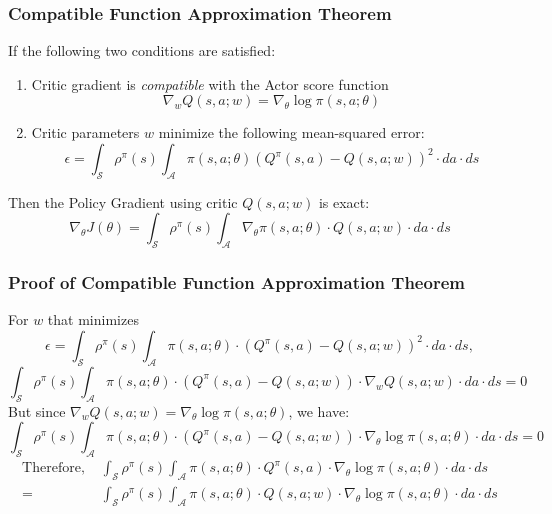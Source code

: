 \documentclass[handout]{beamer}
\begin{document}
\begin{frame}
\frametitle{Compatible Function Approximation Theorem}
\pause
\begin{theorem}
If the following two conditions are satisfied:
\pause
\begin{enumerate}
\item Critic gradient is {\em compatible} with the Actor score function
$$\nabla_w Q(s,a;w) = \nabla_{\theta} \log \pi(s,a; \theta)$$ 
\pause
\item Critic parameters $w$ minimize the following mean-squared error:
$$\epsilon = \int_{\mathcal{S}} \rho^{\pi}(s) \int_{\mathcal{A}} \pi(s,a; \theta) (Q^{\pi}(s,a) - Q(s,a;w))^2 \cdot da \cdot ds$$
\end{enumerate}
\pause
Then the Policy Gradient using critic $Q(s,a;w)$ is exact:
$$\nabla_{\theta} J(\theta) = \int_{\mathcal{S}} \rho^{\pi}(s) \int_{\mathcal{A}} \nabla_{\theta} \pi(s, a; \theta) \cdot Q(s,a; w) \cdot da \cdot ds$$
\end{theorem}
\end{frame}

\begin{frame}
\frametitle{Proof of Compatible Function Approximation Theorem}
\pause
For $w$ that minimizes
$$\epsilon = \int_{\mathcal{S}} \rho^{\pi}(s) \int_{\mathcal{A}} \pi(s,a; \theta) \cdot (Q^{\pi}(s,a) - Q(s,a;w))^2 \cdot da \cdot ds,$$
\pause
$$\int_{\mathcal{S}} \rho^{\pi}(s) \int_{\mathcal{A}} \pi(s,a; \theta) \cdot (Q^{\pi}(s,a) - Q(s,a;w)) \cdot \nabla_w Q(s,a;w) \cdot da \cdot ds = 0$$
\pause
But since $\nabla_w Q(s,a;w) = \nabla_{\theta} \log \pi(s,a; \theta)$, we have:
\pause
$$\int_{\mathcal{S}} \rho^{\pi}(s) \int_{\mathcal{A}} \pi(s,a; \theta) \cdot (Q^{\pi}(s,a) - Q(s,a;w)) \cdot \nabla_{\theta} \log \pi(s,a; \theta) \cdot da \cdot ds = 0$$
\pause
\begin{align*}
\mbox{Therefore, } & \int_{\mathcal{S}} \rho^{\pi}(s) \int_{\mathcal{A}} \pi(s,a; \theta) \cdot Q^{\pi}(s,a) \cdot \nabla_{\theta} \log \pi(s,a; \theta) \cdot da \cdot ds \\
= & \int_{\mathcal{S}} \rho^{\pi}(s) \int_{\mathcal{A}} \pi(s,a; \theta) \cdot Q(s,a; w) \cdot \nabla_{\theta} \log \pi(s,a; \theta) \cdot da \cdot ds\\
\end{align*}
\end{frame}
\end{document}
